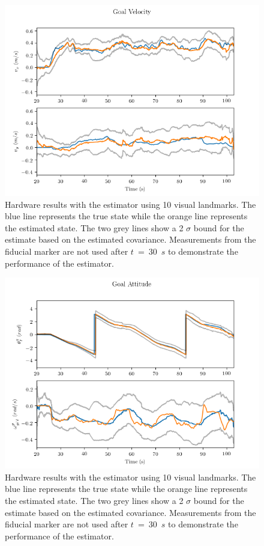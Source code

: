 \begin{figure}
  \centering
  \includegraphics[scale=0.5]{plots/hardware_gv.png}
  \caption{Hardware results with the estimator using 10 visual
  landmarks. The blue line represents the true state while the orange line
  represents the estimated state. The two grey lines show a 2 $\sigma$ bound for
  the estimate based on the estimated covariance. Measurements from the fiducial
  marker are not used after $t$~=~30~$s$ to demonstrate the performance of the estimator.}
  \label{fig:hardware_gv}
\end{figure}

\begin{figure}
  \centering
  \includegraphics[scale=0.5]{plots/hardware_gatt.png}
  \caption{Hardware results with the estimator using 10 visual
  landmarks. The blue line represents the true state while the orange line
  represents the estimated state. The two grey lines show a 2 $\sigma$ bound for
  the estimate based on the estimated covariance. Measurements from the fiducial
  marker are not used after $t$~=~30~$s$ to demonstrate the performance of the estimator.}
  \label{fig:hardware_gatt}
\end{figure}
